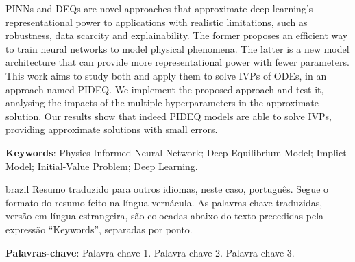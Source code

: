 
\setlength{\absparsep}{18pt} %
\begin{resumo}
	\SingleSpacing
	\Glspl{PINN} and \glspl{DEQ} are novel approaches that approximate deep learning's representational power to applications with realistic limitations, such as robustness, data scarcity and explainability.
	The former proposes an efficient way to train neural networks to model physical phenomena.
	The latter is a new model architecture that can provide more representational power with fewer parameters.
	This work aims to study both and apply them to solve \glspl{IVP} of \glspl{ODE}, in an approach named \gls{PIDEQ}.
	We implement the proposed approach and test it, analysing the impacts of the multiple hyperparameters in the approximate solution.
	Our results show that indeed \gls{PIDEQ} models are able to solve \glspl{IVP}, providing approximate solutions with small errors.
	
	\textbf{Keywords}: Physics-Informed Neural Network; Deep Equilibrium Model; Implict Model; Initial-Value Problem; Deep Learning.
\end{resumo}

\begin{resumo}[Resumo]
	\SingleSpacing
	\begin{otherlanguage*}{brazil}
		Resumo traduzido para outros idiomas, neste caso, português. Segue o formato do resumo feito na língua vernácula. As palavras-chave traduzidas, versão em língua estrangeira, são colocadas abaixo do texto precedidas pela expressão “Keywords”, separadas por ponto.
		
		\textbf{Palavras-chave}: Palavra-chave 1. Palavra-chave 2. Palavra-chave 3.
	\end{otherlanguage*}
\end{resumo}

